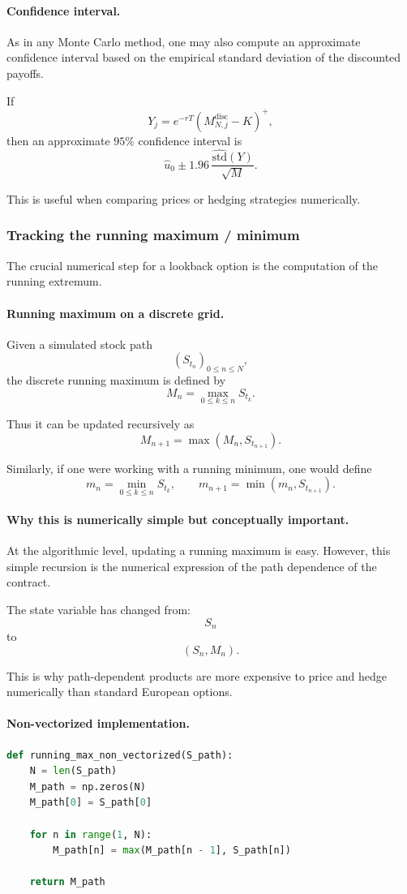 \documentclass[11pt]{article}
\theoremstyle{plain}
\theoremstyle{definition}
\theoremstyle{remark}
\begin{document}
\paragraph{Confidence interval.}
As in any Monte Carlo method, one may also compute an approximate
confidence interval based on the empirical standard deviation of the
discounted payoffs.

If
\[
Y_j=e^{-rT}(M_{N,j}^{\mathrm{disc}}-K)^+,
\]
then an approximate \(95\%\) confidence interval is
\[
\widehat u_0
\pm
1.96\,
\frac{\widehat{\mathrm{std}}(Y)}{\sqrt{M}}.
\]

This is useful when comparing prices or hedging strategies numerically.

\subsubsection{Tracking the running maximum / minimum}

The crucial numerical step for a lookback option is the computation of
the running extremum.

\paragraph{Running maximum on a discrete grid.}
Given a simulated stock path
\[
(S_{t_n})_{0\le n\le N},
\]
the discrete running maximum is defined by
\[
M_n=\max_{0\le k\le n}S_{t_k}.
\]

Thus it can be updated recursively as
\[
M_{n+1}=\max(M_n,S_{t_{n+1}}).
\]

Similarly, if one were working with a running minimum, one would define
\[
m_n=\min_{0\le k\le n}S_{t_k},
\qquad
m_{n+1}=\min(m_n,S_{t_{n+1}}).
\]

\paragraph{Why this is numerically simple but conceptually important.}
At the algorithmic level, updating a running maximum is easy.
However, this simple recursion is the numerical expression of the path
dependence of the contract.

The state variable has changed from:
\[
S_n
\]
to
\[
(S_n,M_n).
\]

This is why path-dependent products are more expensive to price and
hedge numerically than standard European options.

\paragraph{Non-vectorized implementation.}
\begin{lstlisting}[language=Python]
def running_max_non_vectorized(S_path):
    N = len(S_path)
    M_path = np.zeros(N)
    M_path[0] = S_path[0]

    for n in range(1, N):
        M_path[n] = max(M_path[n - 1], S_path[n])

    return M_path
\end{lstlisting}
\end{document}
